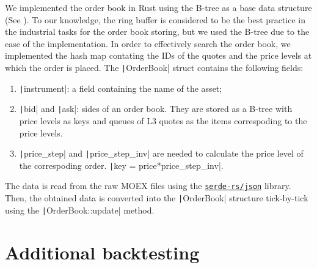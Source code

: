 \begin{appendices}
        We implemented the order book in Rust using the B-tree as a base data structure (See \Cite{Cormen2022}). To our knowledge, 
        the ring buffer is considered to be the best practice in the industrial tasks for the order book storing, but we used 
        the B-tree due to the ease of the implementation.
        In order to effectively search the order book, we implemented the hash map contating the IDs of the quotes and
        the price levels at which the order is placed. The \texttt|OrderBook| struct contains the following fields:
        \begin{enumerate}
            \item \texttt|instrument|: a field containing the name of the asset;
            \item \texttt|bid| and \texttt|ask|: sides of an order book. They are 
                stored as a B-tree with price levels as keys and queues of L3 quotes as the items correspoding
                to the price levels.
            \item \texttt|price_step| and \texttt|price_step_inv| are needed to calculate the 
                price level of the correspoding order. \texttt|key = price*price_step_inv|.
        \end{enumerate}
        The data is read from the raw MOEX files using the \href{github.com/serde-rs/json}{\texttt{serde-rs/json}} library. Then, the obtained data is
        converted into the \texttt|OrderBook| structure tick-by-tick using the \texttt|OrderBook::update| method.

    \section{Additional backtesting}

\end{appendices}   %